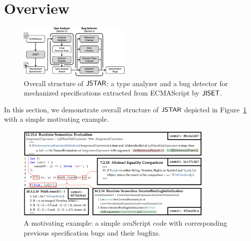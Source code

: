 \section{Overview}\label{sec:overview}

\begin{figure}
  \centering
  \includegraphics[width=0.48\textwidth]{img/overall}
  \vspace*{-1.5em}
  \caption{Overall structure of $\textsf{JSTAR}$: a type analyzer and a bug detector for
  mechanized specifications extracted from ECMAScript by $\textsf{JISET}$.}
  \label{fig:overall}
\end{figure}

In this section, we demonstrate overall structure of $\textsf{JSTAR}$ depicted in
Figure~\ref{fig:overall} with a simple motivating example.

\begin{figure}[t]
  \centering
  \includegraphics[width=0.85\textwidth]{img/example}
  \vspace*{-1em}
  \caption{A motivating example: a simple avaScript code with corresponding
  previous specification bugs and their bugfixs.}
  \label{fig:example}
\end{figure}
